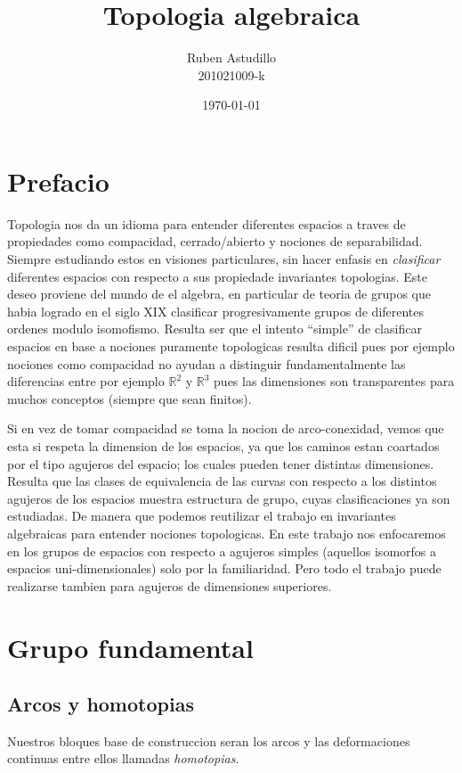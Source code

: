 \documentclass[letterpaper]{article}
\theoremstyle{definition}
\theoremstyle{plain}
\begin{document}
\title{Topologia algebraica}
\author{Ruben Astudillo \\ 201021009-k}
\date{\today}
\maketitle

\section{Prefacio}
Topologia nos da un idioma para entender diferentes espacios a traves de
propiedades como compacidad, cerrado/abierto y nociones de separabilidad.
Siempre estudiando estos en visiones particulares, sin hacer enfasis
en \emph{clasificar} diferentes espacios con respecto a sus propiedade invariantes
topologias. Este deseo proviene del mundo de el algebra, en particular de
teoria de grupos que habia logrado en el siglo XIX clasificar
progresivamente grupos de diferentes ordenes modulo isomofismo.
Resulta ser que el intento ``simple'' de clasificar espacios
en base a nociones puramente topologicas resulta dificil pues por ejemplo
nociones como compacidad no ayudan a distinguir fundamentalmente las
diferencias entre por ejemplo \(\mathbb{R}^2\) y  \(\mathbb{R}^3\) pues las
dimensiones son transparentes para muchos conceptos (siempre que sean finitos).

Si en vez de tomar compacidad se toma la nocion de arco-conexidad,
vemos que esta si respeta la dimension de los espacios, ya que los
caminos estan coartados por el tipo agujeros del espacio; los cuales
pueden tener distintas dimensiones. Resulta que las clases de
equivalencia de las curvas con respecto a los distintos agujeros de los
espacios muestra estructura de grupo, cuyas clasificaciones ya son
estudiadas. De manera que podemos reutilizar el trabajo en invariantes
algebraicas para entender nociones topologicas. En este trabajo nos
enfocaremos en los grupos de espacios con respecto a agujeros simples
(aquellos isomorfos a espacios uni-dimensionales) solo por la
familiaridad. Pero todo el trabajo puede realizarse tambien para agujeros
de dimensiones superiores.

\section{Grupo fundamental}

\subsection{Arcos y homotopias}
Nuestros bloques base de construccion seran los arcos y las
deformaciones continuas entre ellos llamadas \emph{homotopias}.
\end{document}
